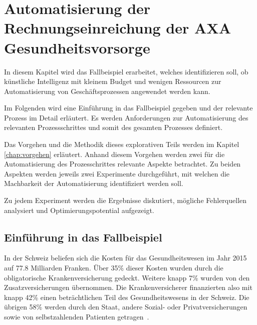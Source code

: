 \section{Automatisierung der Rechnungseinreichung der AXA \nohyphens{Gesundheitsvorsorge}}
\label{chap:experiment}

In diesem Kapitel wird das Fallbeispiel erarbeitet, welches identifizieren soll, ob künstliche Intelligenz mit kleinem Budget und wenigen Ressourcen zur Automatisierung von Geschäftsprozessen angewendet werden kann. 

Im Folgenden wird eine Einführung in das Fallbeispiel gegeben und der relevante Prozess im Detail erläutert. Es werden Anforderungen zur Automatisierung des relevanten Prozessschrittes und somit des gesamten Prozesses definiert.

Das Vorgehen und die Methodik dieses explorativen Teils werden im Kapitel \ref{chap:vorgehen} erläutert. Anhand diesem Vorgehen werden zwei für die Automatisierung des Prozesschrittes relevante Aspekte betrachtet. Zu beiden Aspekten werden jeweils zwei Experimente durchgeführt, mit welchen die Machbarkeit der Automatisierung identifiziert werden soll.

Zu jedem Experiment werden die Ergebnisse diskutiert, mögliche Fehlerquellen analysiert und Optimierungspotential aufgezeigt.




\subsection{Einführung in das Fallbeispiel}
In der Schweiz beliefen sich die Kosten für das Gesundheitswesen im Jahr 2015 auf 77.8 Milliarden Franken. Über 35\% dieser Kosten wurden durch die obligatorische Krankenversicherung gedeckt. Weitere knapp 7\% wurden von den Zusatzversicherungen übernommen. Die Krankenversicherer finanzierten also mit knapp 42\% einen beträchtlichen Teil des Gesundheitswesens in der Schweiz. Die übrigen 58\% werden durch den Staat, andere Sozial- oder Privatversicherungen sowie von selbstzahlenden Patienten getragen~\autocite{BfS2018}.

